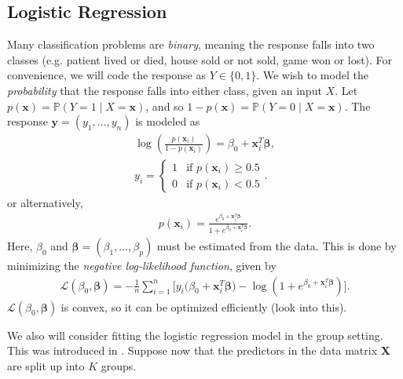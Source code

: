 \documentclass[10pt]{article}
\begin{document}
\subsection{Logistic Regression}
Many classification problems are \textit{binary}, meaning the response falls into two classes (e.g. patient lived or died, house sold or not sold, game won or lost). For convenience, we will code the response as $Y \in \{ 0,1 \}$. We wish to model the \textit{probability} that the response falls into either class, given an input $X$. Let $p(\bm{x}) = \mathbb{P}(Y = 1 \mid X = \bm{x})$, and so $1 - p(\bm{x}) = \mathbb{P}(Y = 0 \mid X = \bm{x})$. The response $\mathbf{y} = (y_1, \ldots, y_n)$ is modeled as 
\begin{align*}
    \log \left( \frac{p(\bm{x}_i)}{1 - p(\bm{x}_i)} \right) = \beta_0 + \bm{x}_i^T \bm{\beta}, \\
    y_i = \begin{cases}
        1 & \text{if } p(\bm{x}_i) \ge 0.5 \\
        0 & \text{if } p(\bm{x}_i) < 0.5
    \end{cases}.
\end{align*}
or alternatively, 
\begin{align*}
    p(\bm{x}_i) = \frac{e^{\beta_0 + \bm{x}_i^T \bm{\beta}}}{1 + e^{\beta_0 + \bm{x}_i^T \bm{\beta}}}.
\end{align*}
Here, $\beta_0$ and $\bm{\beta} = (\beta_1, \ldots, \beta_p)$ must be estimated from the data. This is done by minimizing the \textit{negative log-likelihood function}, given by 
\begin{align}
\label{negloglike}
    \mathcal{L}(\beta_0, \bm{\beta}) = - \frac{1}{n} \sum_{i = 1}^n \Big[ y_i\big(\beta_0 + \bm{x}_i^T \bm{\beta}\big) - \log \left(1 + e^{\beta_0 + \bm{x}_i^T \bm{\beta}}  \right) \Big]. 
\end{align}
$\mathcal{L}(\beta_0, \bm{\beta})$ is convex, so it can be optimized efficiently (look into this).


We also will consider fitting the logistic regression model in the group setting. This was introduced in \cite{meier2008group}. Suppose now that the predictors in the data matrix $\mathbf{X}$ are split up into $K$ groups.  
\end{document}

